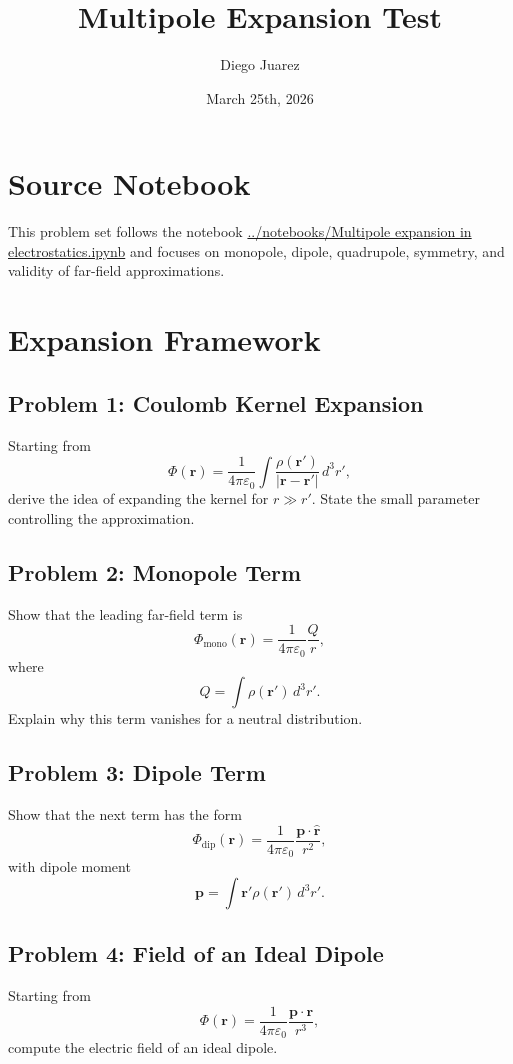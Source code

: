 \documentclass[hidelinks]{article}
\title{\textbf{Multipole Expansion Test}}
\author{Diego Juarez}
\date{March 25th, 2026}
\begin{document}
\hypersetup{bookmarksnumbered=true}
\pagecolor{black}
\color{white}
\maketitle

\begin{Large}
\tableofcontents
\end{Large}
\pagebreak

\section{Source Notebook}
This problem set follows the notebook
\url{../notebooks/Multipole expansion in electrostatics.ipynb}
and focuses on monopole, dipole, quadrupole, symmetry, and validity of far-field approximations.

\section{Expansion Framework}
\subsection{Problem 1: Coulomb Kernel Expansion}
Starting from
\[
\Phi(\mathbf{r})=\frac{1}{4\pi\varepsilon_0}\int \frac{\rho(\mathbf{r}')}{|\mathbf{r}-\mathbf{r}'|}\,d^3r',
\]
derive the idea of expanding the kernel for $r\gg r'$. State the small parameter controlling the approximation.

\subsection{Problem 2: Monopole Term}
Show that the leading far-field term is
\[
\Phi_{\text{mono}}(\mathbf{r})=\frac{1}{4\pi\varepsilon_0}\frac{Q}{r},
\]
where
\[
Q=\int \rho(\mathbf{r}')\,d^3r'.
\]
Explain why this term vanishes for a neutral distribution.

\subsection{Problem 3: Dipole Term}
Show that the next term has the form
\[
\Phi_{\text{dip}}(\mathbf{r})=\frac{1}{4\pi\varepsilon_0}\frac{\mathbf{p}\cdot \hat{\mathbf{r}}}{r^2},
\]
with dipole moment
\[
\mathbf{p}=\int \mathbf{r}'\rho(\mathbf{r}')\,d^3r'.
\]

\subsection{Problem 4: Field of an Ideal Dipole}
Starting from
\[
\Phi(\mathbf{r})=\frac{1}{4\pi\varepsilon_0}\frac{\mathbf{p}\cdot \mathbf{r}}{r^3},
\]
compute the electric field of an ideal dipole.
\end{document}

